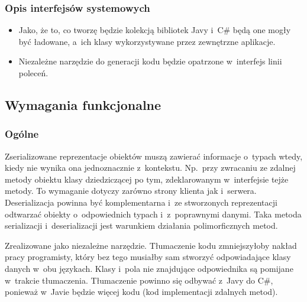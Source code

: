 \subsubsection{Opis interfejsów systemowych}
\begin{itemize}
	\item Jako, że to, co tworzę będzie kolekcją bibliotek Javy i~C\# będą one mogły być ładowane, a~ich klasy wykorzystywane przez zewnętrzne aplikacje.
	\item Niezależne narzędzie do generacji kodu będzie opatrzone w~interfejs linii poleceń.
\end{itemize}


\subsection{Wymagania funkcjonalne}

\subsubsection{Ogólne}

\begin{description}
Zserializowane reprezentacje obiektów muszą zawierać informacje o~typach wtedy, kiedy nie wynika ona jednoznacznie z~kontekstu.
Np.\ przy zwracaniu ze zdalnej metody obiektu klasy dziedziczącej po tym, zdeklarowanym w~interfejsie tejże metody.
To wymaganie dotyczy zarówno strony klienta jak i~serwera.
Deserializacja powinna być komplementarna i~ze stworzonych reprezentacji odtwarzać obiekty o~odpowiednich typach i~z~poprawnymi danymi.
Taka metoda serializacji i~deserializacji jest warunkiem działania polimorficznych metod.

Zrealizowane jako niezależne narzędzie.
Tłumaczenie kodu zmniejszyłoby nakład pracy programisty, który bez tego musiałby sam stworzyć odpowiadające klasy danych w~obu językach.
Klasy i~pola nie znajdujące odpowiednika są pomijane w~trakcie tłumaczenia.
Tłumaczenie powinno się odbywać z~Javy do C\#, ponieważ w~Javie będzie więcej kodu (kod implementacji zdalnych metod).
\end{description}

